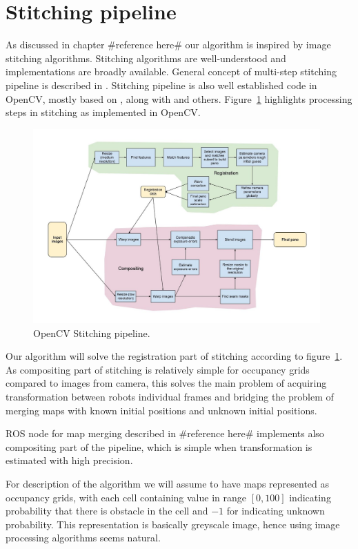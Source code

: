\section{Stitching pipeline}

As discussed in chapter \#reference here\# our algorithm is inspired by image stitching algorithms. Stitching algorithms are well-understood and implementations are broadly available. General concept of multi-step stitching pipeline is described in \cite{Brown2006}. Stitching pipeline is also well established code in OpenCV, mostly based on \cite{Brown2006}, along with \cite{Szeliski2004} \cite{Shum1998} and others. Figure~\ref{fig:opencv} highlights processing steps in stitching as implemented in OpenCV.

\begin{figure}
	\centering
	\includegraphics[width=4.33in]{../img/StitchingPipeline.jpg}
	\caption{OpenCV Stitching pipeline.}
	\label{fig:opencv}
\end{figure}

Our algorithm will solve the registration part of stitching according to figure~\ref{fig:opencv}. As compositing part of stitching is relatively simple for occupancy grids compared to images from camera, this solves the main problem of acquiring transformation between robots individual frames and bridging the problem of merging maps with known initial positions and unknown initial positions.

ROS node for map merging described in \#reference here\# implements also compositing part of the pipeline, which is simple when transformation is estimated with high precision.

For description of the algorithm we will assume to have maps represented as occupancy grids, with each cell containing value in range $[0,100]$ indicating probability that there is obstacle in the cell and $-1$ for indicating unknown probability. This representation is basically greyscale image, hence using image processing algorithms seems natural.

